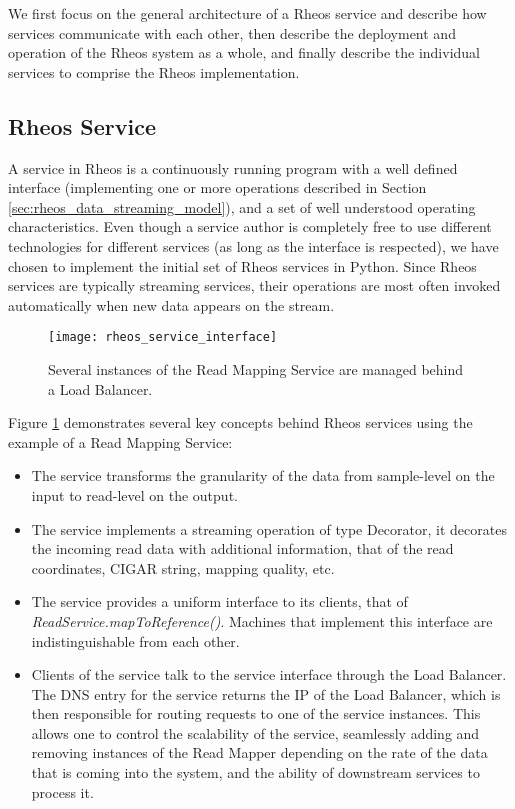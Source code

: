 We first focus on the general architecture of a Rheos service and describe how services communicate with each other, then describe the deployment and operation of the Rheos system as a whole, and finally describe the individual services to comprise the Rheos implementation.

\subsection{Rheos Service}
A service in Rheos is a continuously running program with a well defined interface (implementing one or more operations described in Section \ref{sec:rheos_data_streaming_model}), and a set of well understood operating characteristics. Even though a service author is completely free to use different technologies for different services (as long as the interface is respected), we have chosen to implement the initial set of Rheos services in Python. Since Rheos services are typically streaming services, their operations are most often invoked automatically when new data appears on the stream.

\begin{figure}[H]
    \texttt{[image: rheos\_service\_interface]}
    \centering
    \caption {Several instances of the Read Mapping Service are managed behind a Load Balancer.}
    \label{fig:rheos_service_interface}
\end{figure}
\newpage
Figure \ref{fig:rheos_service_interface} demonstrates several key concepts behind Rheos services using the example of a Read Mapping Service:

\begin{itemize}
    \item The service transforms the granularity of the data from sample-level on the input to read-level on the output. 
    \item The service implements a streaming operation of type Decorator, it decorates the incoming read data with additional information, that of the read coordinates, CIGAR string, mapping quality, etc. 
    \item The service provides a uniform interface to its clients, that of \emph{ReadService.mapToReference()}. Machines that implement this interface are indistinguishable from each other. 
    \item Clients of the service talk to the service interface through the Load Balancer. The DNS entry for the service returns the IP of the Load Balancer, which is then responsible for routing requests to one of the service instances. This allows one to control the scalability of the service, seamlessly adding and removing instances of the Read Mapper depending on the rate of the data that is coming into the system, and the ability of downstream services to process it.  
\end{itemize}


